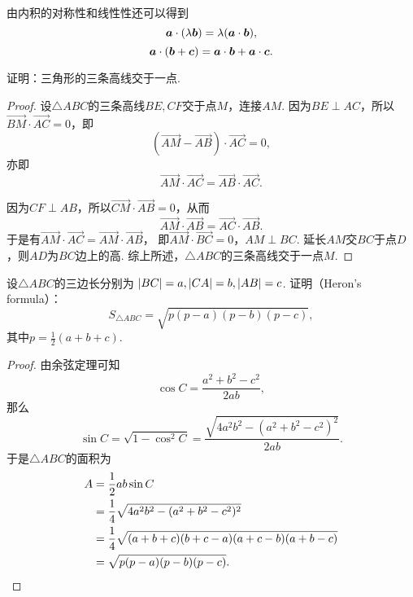 由内积的对称性和线性性还可以得到\[
	\boldsymbol{a}\cdot(\lambda\boldsymbol{b})=\lambda(\boldsymbol{a}\cdot\boldsymbol{b}),
\]\[
	\boldsymbol{a}\cdot(\boldsymbol{b}+\boldsymbol{c})=\boldsymbol{a}\cdot\boldsymbol{b}+\boldsymbol{a}\cdot\boldsymbol{c}.
\]

\begin{example}
证明：三角形的三条高线交于一点.
\begin{proof}
设\(\triangle ABC\)的三条高线\(BE,CF\)交于点\(M\)，连接\(AM\).
因为\(BE \perp AC\)，所以\(\vec{BM}\cdot\vec{AC}=0\)，即\[
	(\vec{AM}-\vec{AB})\cdot\vec{AC}=0,
\]
亦即\[
	\vec{AM}\cdot\vec{AC}=\vec{AB}\cdot\vec{AC}.
\]

因为\(CF \perp AB\)，所以\(\vec{CM}\cdot\vec{AB}=0\)，从而\[
	\vec{AM}\cdot\vec{AB}=\vec{AC}\cdot\vec{AB}.
\]
于是有\(\vec{AM}\cdot\vec{AC}=\vec{AM}\cdot\vec{AB}\)，
即\(\vec{AM}\cdot\vec{BC}=0\)，\(AM \perp BC\).
延长\(AM\)交\(BC\)于点\(D\)，则\(AD\)为\(BC\)边上的高.
综上所述，\(\triangle ABC\)的三条高线交于一点\(M\).
\end{proof}
\end{example}

\begin{example}
设\(\triangle ABC\)的三边长分别为
\(\abs{BC} = a,
\abs{CA} = b,
\abs{AB} = c\).
证明（Heron's formula）：\begin{equation}
	S_{\triangle ABC}
	= \sqrt{p (p-a) (p-b) (p-c)},
\end{equation}
其中\(p = \frac12(a+b+c)\).
\begin{proof}
由余弦定理可知\begin{equation*}
	\cos C = \frac{a^2+b^2-c^2}{2ab},
\end{equation*}
那么\begin{equation*}
	\sin C = \sqrt{1 - \cos^2 C}
	= \frac{\sqrt{4a^2b^2 - (a^2+b^2-c^2)^2}}{2ab}.
\end{equation*}
于是\(\triangle ABC\)的面积为\begin{align*}
	A &= \frac12 a b \sin C \\
	&= \frac14 \sqrt{4a^2b^2 - (a^2+b^2-c^2)^2} \\
	&= \frac14 \sqrt{(a+b+c)(b+c-a)(a+c-b)(a+b-c)} \\
	&= \sqrt{p (p-a) (p-b) (p-c)}.
	\qedhere
\end{align*}
\end{proof}
\end{example}

